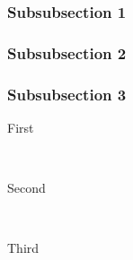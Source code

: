 \documentclass[12pt]{article} %
\begin{document}
\subsubsection{Subsubsection 1} %

\lipsum[6] %


\subsubsection{Subsubsection 2} %

\lipsum[6] %
\lipsum[7-8] %


\subsubsection{Subsubsection 3} %

\begin{description} %

\item[First] \hfill \\
\lipsum[9] %

\item[Second] \hfill \\
\lipsum[10] %

\item[Third] \hfill \\
\lipsum[11] %

\end{description} 


\end{document}
